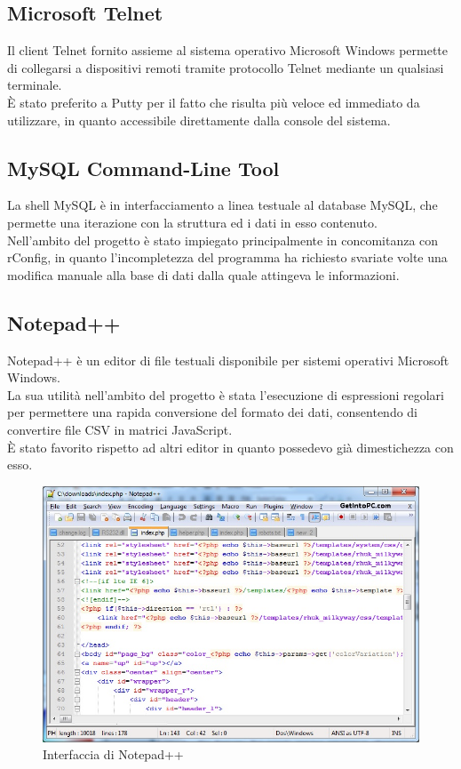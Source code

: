 \documentclass[Tesi.tex]{subfiles}
\begin{document}
\subsection{Microsoft Telnet}
Il client Telnet fornito assieme al sistema operativo Microsoft Windows permette di collegarsi a dispositivi remoti tramite protocollo Telnet mediante un qualsiasi terminale. \\
\`{E} stato preferito a Putty per il fatto che risulta più veloce ed immediato da utilizzare, in quanto accessibile direttamente dalla console del sistema.

\subsection{MySQL Command-Line Tool}
La shell MySQL è in interfacciamento a linea testuale al database MySQL, che permette una iterazione con la struttura ed i dati in esso contenuto. \\
Nell'ambito del progetto è stato impiegato principalmente in concomitanza con rConfig, in quanto l'incompletezza del programma ha richiesto svariate volte una modifica manuale alla base di dati dalla quale attingeva le informazioni.

\subsection{Notepad++}
Notepad++ è un editor di file testuali disponibile per sistemi operativi Microsoft Windows.\\
La sua utilità nell'ambito del progetto è stata l'esecuzione di espressioni regolari per permettere una rapida conversione del formato dei dati, consentendo di convertire file CSV in matrici JavaScript.\\
\`{E} stato favorito rispetto ad altri editor in quanto possedevo già dimestichezza con esso.
\begin{figure}[H]
	\centering
	\includegraphics[width=0.7\linewidth]{"images/notepad++"}
	\caption{Interfaccia di Notepad++}
	\label{fig:Interfaccia di Notepad++}
\end{figure}
\end{document}
